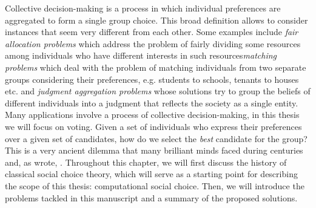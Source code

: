 Collective decision-making is a process in which individual preferences are aggregated to form a single group choice. This broad definition allows to consider instances that seem very different from each other. Some examples include \textit{fair allocation problems} \textemdash which address the problem of fairly dividing some resources among individuals who have different interests in such resources\textemdash \textit{matching problems} \textemdash which deal with the problem of matching individuals from two separate groups considering their preferences, e.g. students to schools, tenants to houses etc. \textemdash and \textit{judgment aggregation problems} \textemdash whose solutions try to group the beliefs of different individuals into a judgment that reflects the society as a single entity. Many applications involve a process of collective decision-making, in this thesis we will focus on voting. Given a set of individuals who express their preferences over a given set of candidates, how do we select the \textit{best} candidate for the group? This is a very ancient dilemma that many brilliant minds faced during centuries and, as \citet{McLean1990} wrote, . Throughout this chapter, we will first discuss the history of classical social choice theory, which will serve as a starting point for describing the scope of this thesis: computational social choice. 
Then, we will introduce the problems tackled in this manuscript and a summary of the proposed solutions.

